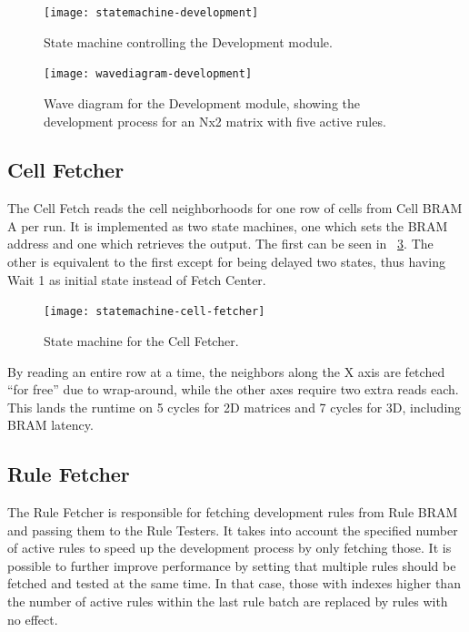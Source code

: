 \begin{figure}[!ht]
    \centering
    \texttt{[image: statemachine-development]}
    \caption[Development module state machine]{
        State machine controlling the Development module.
    }
    \label{fig:statemachine-development}
\end{figure}

\begin{figure}
    \centering
    \texttt{[image: wavediagram-development]}
    \caption[Development module wave diagram]{
        Wave diagram for the Development module, showing the development process for an Nx2 matrix with five active rules.
    }
    \label{fig:wavediagram-development}
\end{figure}

\subsection{Cell Fetcher}

The Cell Fetch reads the cell neighborhoods for one row of cells from Cell BRAM A per run.
It is implemented as two state machines, one which sets the BRAM address and one which retrieves the output.
The first can be seen in \figurename~\ref{fig:statemachine-cell-fetcher}.
The other is equivalent to the first except for being delayed two states, thus having Wait 1 as initial state instead of Fetch Center.

\begin{figure}[!ht]
    \centering
    \texttt{[image: statemachine-cell-fetcher]}
    \caption[Cell Fetcher state machine]{
        State machine for the Cell Fetcher.
    }
    \label{fig:statemachine-cell-fetcher}
\end{figure}

By reading an entire row at a time, the neighbors along the X axis are fetched ``for free'' due to wrap-around, while the other axes require two extra reads each.
This lands the runtime on 5 cycles for 2D matrices and 7 cycles for 3D, including BRAM latency.

\subsection{Rule Fetcher}

The Rule Fetcher is responsible for fetching development rules from Rule BRAM and passing them to the Rule Testers.
It takes into account the specified number of active rules to speed up the development process by only fetching those.
It is possible to further improve performance by setting that multiple rules should be fetched and tested at the same time.
In that case, those with indexes higher than the number of active rules within the last rule batch are replaced by rules with no effect.

